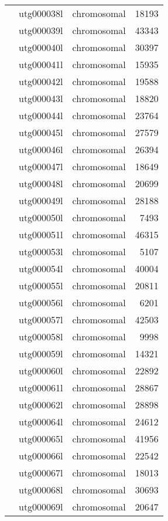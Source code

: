 {\begin{supertabular}{llcr}
          & utg000038l & chromosomal & 18193 \\
          & utg000039l & chromosomal & 43343 \\
          & utg000040l & chromosomal & 30397 \\
          & utg000041l & chromosomal & 15935 \\
          & utg000042l & chromosomal & 19588 \\
          & utg000043l & chromosomal & 18820 \\
          & utg000044l & chromosomal & 23764 \\
          & utg000045l & chromosomal & 27579 \\
          & utg000046l & chromosomal & 26394 \\
          & utg000047l & chromosomal & 18649 \\
          & utg000048l & chromosomal & 20699 \\
          & utg000049l & chromosomal & 28188 \\
          & utg000050l & chromosomal & 7493 \\
          & utg000051l & chromosomal & 46315 \\
          & utg000053l & chromosomal & 5107 \\
          & utg000054l & chromosomal & 40004 \\
          & utg000055l & chromosomal & 20811 \\
          & utg000056l & chromosomal & 6201 \\
          & utg000057l & chromosomal & 42503 \\
          & utg000058l & chromosomal & 9998 \\
          & utg000059l & chromosomal & 14321 \\
          & utg000060l & chromosomal & 22892 \\
          & utg000061l & chromosomal & 28867 \\
          & utg000062l & chromosomal & 28898 \\
          & utg000064l & chromosomal & 24612 \\
          & utg000065l & chromosomal & 41956 \\
          & utg000066l & chromosomal & 22542 \\
          & utg000067l & chromosomal & 18013 \\
          & utg000068l & chromosomal & 30693 \\
          & utg000069l & chromosomal & 20647 \\

\end{supertabular}}
